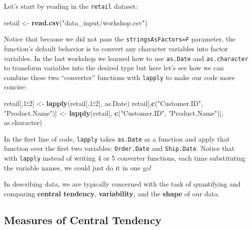 \documentclass[]{article}
\newenvironment{Shaded}{\begin{snugshade}}{\end{snugshade}}
\newcommand{\DecValTok}[1]{\textcolor[rgb]{0.00,0.00,0.81}{#1}}
\newcommand{\KeywordTok}[1]{\textcolor[rgb]{0.13,0.29,0.53}{\textbf{#1}}}
\newcommand{\NormalTok}[1]{#1}
\newcommand{\OperatorTok}[1]{\textcolor[rgb]{0.81,0.36,0.00}{\textbf{#1}}}
\newcommand{\StringTok}[1]{\textcolor[rgb]{0.31,0.60,0.02}{#1}}
\begin{document}
Let's start by reading in the \texttt{retail} dataset:

\begin{Shaded}
\begin{Highlighting}[]
\NormalTok{retail <-}\StringTok{ }\KeywordTok{read.csv}\NormalTok{(}\StringTok{"data_input/workshop.csv"}\NormalTok{)}
\end{Highlighting}
\end{Shaded}

Notice that because we did not pass the \texttt{stringsAsFactors=F}
parameter, the function's default behavior is to convert any character
variables into factor variables. In the last workshop we learned how to
use \texttt{as.Date} and \texttt{as.character} to transform variables
into the desired type but here let's see how we can combine these two
``converter'' functions with \texttt{lapply} to make our code more
concise:

\begin{Shaded}
\begin{Highlighting}[]
\NormalTok{retail[,}\DecValTok{1}\OperatorTok{:}\DecValTok{2}\NormalTok{] <-}\StringTok{ }\KeywordTok{lapply}\NormalTok{(retail[,}\DecValTok{1}\OperatorTok{:}\DecValTok{2}\NormalTok{], as.Date)}
\NormalTok{retail[,}\KeywordTok{c}\NormalTok{(}\StringTok{"Customer.ID"}\NormalTok{, }\StringTok{"Product.Name"}\NormalTok{)] <-}\StringTok{ }\KeywordTok{lapply}\NormalTok{(retail[, }\KeywordTok{c}\NormalTok{(}\StringTok{"Customer.ID"}\NormalTok{, }\StringTok{"Product.Name"}\NormalTok{)], as.character)}
\end{Highlighting}
\end{Shaded}

In the first line of code, \texttt{lapply} takes \texttt{as.Date} as a
function and apply that function over the first two variables:
\texttt{Order.Date} and \texttt{Ship.Date}. Notice that with
\texttt{lapply} instead of writing 4 or 5 converter functions, each time
substituting the variable names, we could just do it in one go!

In describing data, we are typically concerned with the task of
quantifying and comparing \textbf{central tendency},
\textbf{variability}, and the \textbf{shape} of our data.

\hypertarget{measures-of-central-tendency}{%
\subsection{Measures of Central
Tendency}\label{measures-of-central-tendency}}
\end{document}
